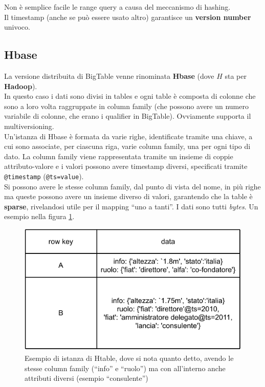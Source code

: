\documentclass[a4paper,12pt, oneside]{book}
\begin{document}
Non è semplice facile le range query a causa del meccanismo di hashing.\\
Il timestamp (anche se può essere usato altro) garantisce un \textbf{version
  number} univoco.
\subsection{Hbase}
La versione distribuita di BigTable venne rinominata \textbf{Hbase} (dove $H$
sta per \textbf{Hadoop}).\\
In questo caso i dati sono divisi in tables e ogni table è composta di colonne
che sono a loro volta raggruppate in column family (che possono avere un numero
variabile di colonne, che erano i qualifier in BigTable). Ovviamente supporta il
multiversioning.\\
Un'istanza di Hbase è formata da varie righe, identificate tramite una chiave, a
cui sono associate, per ciascuna riga, varie column family, una per ogni tipo di
dato. La column family viene rappresentata tramite un insieme di coppie
attributo-valore e i valori possono avere timestamp diversi, specificati tramite
\texttt{@timestamp} (\texttt{@ts=value}).\\
Si possono avere le stesse column family, dal punto di vista del nome, in più
righe ma queste possono avere un insieme diverso di valori, garantendo che la
table è \textbf{sparse}, rivelandosi utile per il mapping ``uno a tanti''. I
dati sono tutti \textit{bytes}. Un esempio nella figura \ref{fig:col2}.
\begin{figure}
  \centering
  \includegraphics[scale = 0.8]{img/col2.pdf}
  \caption{Esempio di istanza di Htable, dove si nota quanto detto, avendo le
    stesse column family (``info'' e ``ruolo'') ma con all'interno anche
    attributi diversi (esempio ``consulente'')}
  \label{fig:col2}
\end{figure}
\end{document}
